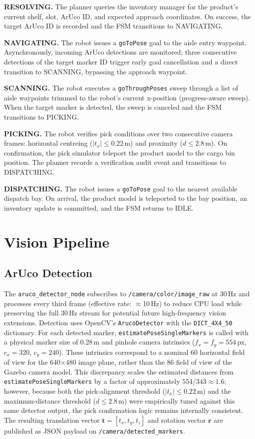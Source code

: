 \documentclass[12pt,a4paper]{report}
\begin{document}
\textbf{RESOLVING.} The planner queries the inventory manager for the product's current shelf, slot, ArUco ID, and expected approach coordinates. On success, the target ArUco ID is recorded and the FSM transitions to NAVIGATING.

\textbf{NAVIGATING.} The robot issues a \texttt{goToPose} goal to the aisle entry waypoint. Asynchronously, incoming ArUco detections are monitored; three consecutive detections of the target marker ID trigger early goal cancellation and a direct transition to SCANNING, bypassing the approach waypoint.

\textbf{SCANNING.} The robot executes a \texttt{goThroughPoses} sweep through a list of aisle waypoints trimmed to the robot's current x-position (progress-aware sweep). When the target marker is detected, the sweep is canceled and the FSM transitions to PICKING.

\textbf{PICKING.} The robot verifies pick conditions over two consecutive camera frames: horizontal centreing ($|t_x| \leq 0.22$\,m) and proximity ($d \leq 2.8$\,m). On confirmation, the pick simulator teleport the product model to the cargo bin position. The planner records a verification audit event and transitions to DISPATCHING.

\textbf{DISPATCHING.} The robot issues a \texttt{goToPose} goal to the nearest available dispatch bay. On arrival, the product model is teleported to the bay position, an inventory update is committed, and the FSM returns to IDLE.

\section{Vision Pipeline}

\subsection{ArUco Detection}

The \texttt{aruco\_detector\_node} subscribes to \texttt{/camera/color/image\_raw} at 30\,Hz and processes every third frame (effective rate: $\approx$10\,Hz) to reduce CPU load while preserving the full 30\,Hz stream for potential future high-frequency vision extensions. Detection uses OpenCV's \texttt{ArucoDetector} with the \texttt{DICT\_4X4\_50} dictionary. For each detected marker, \texttt{estimatePoseSingleMarkers} is called with a physical marker size of 0.28\,m and pinhole camera intrinsics ($f_x = f_y = 554$\,px, $c_x = 320$, $c_y = 240$). These intrinsics correspond to a nominal 60\textdegree{} horizontal field of view for the 640$\times$480 image plane, rather than the 86\textdegree{} field of view of the Gazebo camera model. This discrepancy scales the estimated distances from \texttt{estimatePoseSingleMarkers} by a factor of approximately $554/343 \approx 1.6$; however, because both the pick-alignment threshold ($|t_x| \leq 0.22$\,m) and the maximum-distance threshold ($d \leq 2.8$\,m) were empirically tuned against this same detector output, the pick confirmation logic remains internally consistent. The resulting translation vector $\mathbf{t} = [t_x, t_y, t_z]$ and rotation vector $\mathbf{r}$ are published as JSON payload on \texttt{/camera/detected\_markers}.
\end{document}
